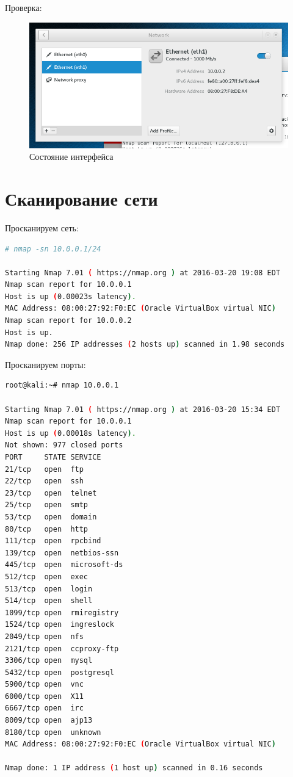 Проверка:

\begin{figure}[H]
	\includegraphics[width=\textwidth]{images/2.png}
	\caption{Состояние интерфейса}
\end{figure}

\section{Сканирование сети}

Просканируем сеть:

\begin{lstlisting}[language=bash]
# nmap -sn 10.0.0.1/24

Starting Nmap 7.01 ( https://nmap.org ) at 2016-03-20 19:08 EDT
Nmap scan report for 10.0.0.1
Host is up (0.00023s latency).
MAC Address: 08:00:27:92:F0:EC (Oracle VirtualBox virtual NIC)
Nmap scan report for 10.0.0.2
Host is up.
Nmap done: 256 IP addresses (2 hosts up) scanned in 1.98 seconds
\end{lstlisting}

Просканируем порты:

\begin{lstlisting}[language=bash]
root@kali:~# nmap 10.0.0.1

Starting Nmap 7.01 ( https://nmap.org ) at 2016-03-20 15:34 EDT
Nmap scan report for 10.0.0.1
Host is up (0.00018s latency).
Not shown: 977 closed ports
PORT     STATE SERVICE
21/tcp   open  ftp
22/tcp   open  ssh
23/tcp   open  telnet
25/tcp   open  smtp
53/tcp   open  domain
80/tcp   open  http
111/tcp  open  rpcbind
139/tcp  open  netbios-ssn
445/tcp  open  microsoft-ds
512/tcp  open  exec
513/tcp  open  login
514/tcp  open  shell
1099/tcp open  rmiregistry
1524/tcp open  ingreslock
2049/tcp open  nfs
2121/tcp open  ccproxy-ftp
3306/tcp open  mysql
5432/tcp open  postgresql
5900/tcp open  vnc
6000/tcp open  X11
6667/tcp open  irc
8009/tcp open  ajp13
8180/tcp open  unknown
MAC Address: 08:00:27:92:F0:EC (Oracle VirtualBox virtual NIC)

Nmap done: 1 IP address (1 host up) scanned in 0.16 seconds
\end{lstlisting}

